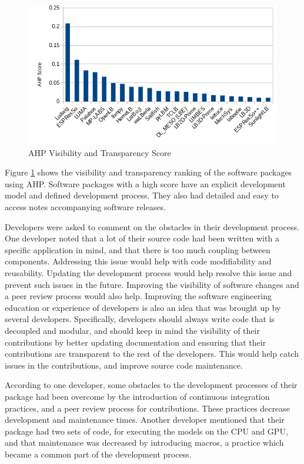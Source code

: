 \documentclass[12pt, notitlepage]{article}
\begin{document}
\begin{figure}[h!]
	\begin{center}
		\includegraphics[width=1.0\textwidth]{visibilitytransparency_chart}
		\caption{AHP Visibility and Transparency Score}
		\label{Fig_VisibilityTransparency}
	\end{center}
\end{figure}

Figure \ref{Fig_VisibilityTransparency} shows the visibility and transparency ranking of the software packages using AHP. Software packages with a high score have an explicit development model and defined development process. They also 
had detailed and easy to access notes accompanying software releases. 

Developers were asked to comment on the obstacles in their development process. One developer noted that a lot of their source code had been written with a specific application in mind, and that there is too much coupling between components. Addressing this issue would help with code modifiability and reusability. Updating the development process would help resolve this issue and prevent such issues in the future. Improving the visibility of software changes and a peer review process would also help. Improving the software engineering education or experience of developers is also an idea that was brought up by several developers. Specifically, developers should always write code that is decoupled and modular, and should keep in mind the visibility of their contributions by better updating documentation and ensuring that their contributions are transparent to the rest of the developers. This would help catch issues in the contributions, and improve source code maintenance.   

According to one developer, some obstacles to the development processes of their package had been overcome by the introduction of continuous integration practices, and a peer review process for contributions. These practices decrease development and maintenance times. Another developer mentioned that their package had two sets of code, for executing the models on the CPU and GPU, and that maintenance was decreased by introducing macros, a practice which became a common part of the development process. 
\end{document}

